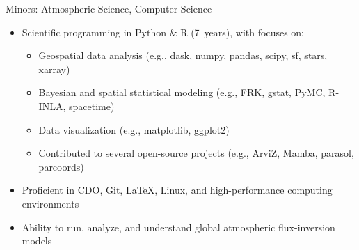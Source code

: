 \documentclass[10pt,a4paper,ragged2e,withhyper]{altacv}
\begin{document}
\begin{paracol}{2}

  
  \vspace{-0.5em}
  \divider


  \vspace{-0.5em}
  \divider

  {\small Minors: Atmospheric Science, Computer Science}

  \bigskip


  \begin{itemize}
    \item Scientific programming in Python \& R (7~years), with focuses on:
      \begin{itemize}
        \item Geospatial data analysis (e.g., dask, numpy, pandas, scipy, sf, stars, xarray)
        \item Bayesian and spatial statistical modeling (e.g., FRK, gstat, PyMC, R-INLA, spacetime)
        \item Data visualization (e.g., matplotlib, ggplot2)
        \item Contributed to several open-source projects (e.g., ArviZ, Mamba, parasol, parcoords)
      \end{itemize}
    \item Proficient in CDO, Git, LaTeX, Linux, and high-performance computing environments
    \item Ability to run, analyze, and understand global atmospheric flux-inversion models
  \end{itemize}

  \vspace{-0.5em}
  \divider


\end{paracol}
\end{document}
